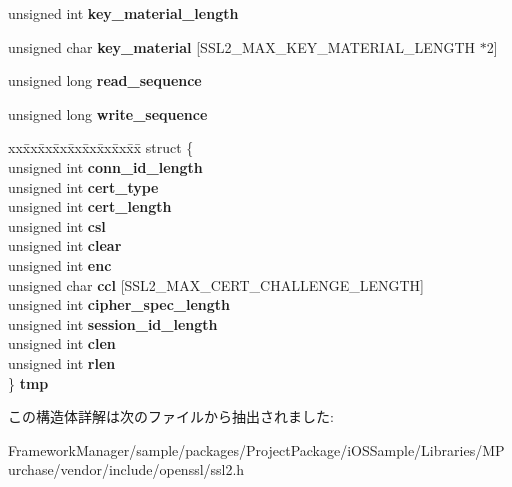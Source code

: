 \begin{DoxyCompactItemize}
\item 
\hypertarget{structssl2__state__st_a27ac33d76f88e922c9e3a3db0f4660c0}{}unsigned int {\bfseries key\+\_\+material\+\_\+length}\label{structssl2__state__st_a27ac33d76f88e922c9e3a3db0f4660c0}

\item 
\hypertarget{structssl2__state__st_a32726d50cdce6e7de2b5734b77b92ab9}{}unsigned char {\bfseries key\+\_\+material} \mbox{[}S\+S\+L2\+\_\+\+M\+A\+X\+\_\+\+K\+E\+Y\+\_\+\+M\+A\+T\+E\+R\+I\+A\+L\+\_\+\+L\+E\+N\+G\+T\+H $\ast$2\mbox{]}\label{structssl2__state__st_a32726d50cdce6e7de2b5734b77b92ab9}

\item 
\hypertarget{structssl2__state__st_a8033b51398769bf5020d2146e8a42026}{}unsigned long {\bfseries read\+\_\+sequence}\label{structssl2__state__st_a8033b51398769bf5020d2146e8a42026}

\item 
\hypertarget{structssl2__state__st_a3a3f232e547d9f5edecb3bc3374fbc1a}{}unsigned long {\bfseries write\+\_\+sequence}\label{structssl2__state__st_a3a3f232e547d9f5edecb3bc3374fbc1a}

\item 
\hypertarget{structssl2__state__st_a3bb7be5bc0325906adea7207adba0ffd}{}\begin{tabbing}
xx\=xx\=xx\=xx\=xx\=xx\=xx\=xx\=xx\=\kill
struct \{\\
\>unsigned int {\bfseries conn\_id\_length}\\
\>unsigned int {\bfseries cert\_type}\\
\>unsigned int {\bfseries cert\_length}\\
\>unsigned int {\bfseries csl}\\
\>unsigned int {\bfseries clear}\\
\>unsigned int {\bfseries enc}\\
\>unsigned char {\bfseries ccl} \mbox{[}SSL2\_MAX\_CERT\_CHALLENGE\_LENGTH\mbox{]}\\
\>unsigned int {\bfseries cipher\_spec\_length}\\
\>unsigned int {\bfseries session\_id\_length}\\
\>unsigned int {\bfseries clen}\\
\>unsigned int {\bfseries rlen}\\
\} {\bfseries tmp}\label{structssl2__state__st_a3bb7be5bc0325906adea7207adba0ffd}
\\

\end{tabbing}\end{DoxyCompactItemize}


この構造体詳解は次のファイルから抽出されました\+:\begin{DoxyCompactItemize}
\item 
Framework\+Manager/sample/packages/\+Project\+Package/i\+O\+S\+Sample/\+Libraries/\+M\+Purchase/vendor/include/openssl/ssl2.\+h\end{DoxyCompactItemize}
